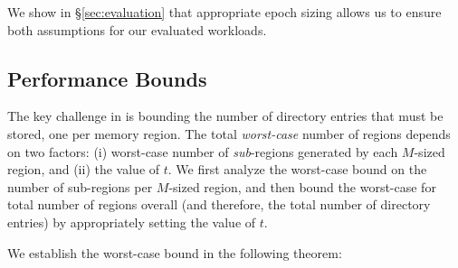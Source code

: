 \noindent
We show in \S\ref{sec:evaluation} that appropriate epoch sizing allows us to ensure both assumptions for our evaluated workloads.

\subsection{Performance Bounds}
\label{ssec:bound}
The key challenge in \mindalgo is bounding the number of directory entries that must be stored, one per memory region. The total \textit{worst-case} number of regions depends on two factors: (i) worst-case number of \textit{sub}-regions generated by each $M$-sized region, and (ii) the value of $t$. We first analyze the worst-case bound on the number of sub-regions per $M$-sized region, and then bound the worst-case for total number of regions overall (and therefore, the total number of directory entries) by appropriately setting the value of $t$.


 We establish the worst-case bound in the following theorem:

